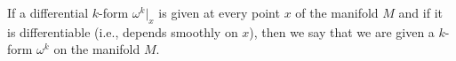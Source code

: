 If a differential $k$-form $\omega^k|_x$ is given at every point $x$ of the manifold $M$ and if it is differentiable (i.e., depends smoothly on $x$), then we say that we are given a $k$-form $\omega^k$ on the manifold $M$.
